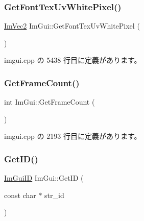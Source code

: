 \mbox{\label{namespace_im_gui_a3092da6abc1d04f3287c084435dc6026}} 
\subsubsection{\texorpdfstring{Get\+Font\+Tex\+Uv\+White\+Pixel()}{GetFontTexUvWhitePixel()}}
{\footnotesize\ttfamily \mbox{\hyperlink{struct_im_vec2}{Im\+Vec2}} Im\+Gui\+::\+Get\+Font\+Tex\+Uv\+White\+Pixel (\begin{DoxyParamCaption}{ }\end{DoxyParamCaption})}



 imgui.\+cpp の 5438 行目に定義があります。

\mbox{\label{namespace_im_gui_a0180211f23fc10807dfc3d2f6e8681f9}} 
\subsubsection{\texorpdfstring{Get\+Frame\+Count()}{GetFrameCount()}}
{\footnotesize\ttfamily int Im\+Gui\+::\+Get\+Frame\+Count (\begin{DoxyParamCaption}{ }\end{DoxyParamCaption})}



 imgui.\+cpp の 2193 行目に定義があります。

\mbox{\label{namespace_im_gui_a3329b04bd4235e90ad9deb00ffb38ae4}} 
\subsubsection{\texorpdfstring{Get\+I\+D()}{GetID()}\hspace{0.1cm}{\footnotesize\ttfamily [1/3]}}
{\footnotesize\ttfamily \mbox{\hyperlink{imgui_8h_a1785c9b6f4e16406764a85f32582236f}{Im\+Gui\+ID}} Im\+Gui\+::\+Get\+ID (\begin{DoxyParamCaption}\item[{const char $\ast$}]{str\+\_\+id }\end{DoxyParamCaption})}



